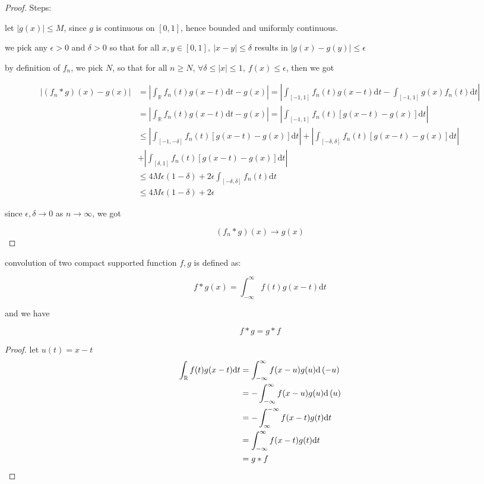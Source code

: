 \begin{proof}
    Steps:

    let $|g(x)| \le M$, since $g$ is continuous on $[0,1]$, hence bounded and uniformly continuous.

    we pick any $\epsilon > 0$ 
    and $\delta > 0$ so that 
    for all $x,y \in [0,1],\: |x-y| \le \delta $  results in $|g(x) -g(y)| \le \epsilon$

    by definition of $f_n$, we pick $N$, so that for all $n \ge N$, 
    $\forall  \delta \le |x| \le 1,\:  f(x) \le \epsilon$, 
    then we got

    \begin{align*}
        \left| (f_n \ast g)(x) - g(x) \right| &= \left| \int_{\mathbb{R}}f_n(t)g(x-t) \mathrm{d}t  - g(x)\right| = \left| \int_{[-1,1]}f_n(t)g(x-t) \mathrm{d}t  - \int_{[-1,1]}g(x) f_n(t) \mathrm{d}t \right| \\ 
        & = \left| \int_{\mathbb{R}}f_n(t)g(x-t) \mathrm{d}t  - g(x)\right| = \left| \int_{[-1,1]}f_n(t)\left[g(x-t) -g(x) \right]\mathrm{d}t   \right| \\
        & \le \left| \int_{[-1,-\delta]}f_n(t)\left[g(x-t) -g(x) \right]\mathrm{d}t   \right| + \left| \int_{[-\delta,\delta]}f_n(t)\left[g(x-t) -g(x) \right]\mathrm{d}t   \right| \\
        & + \left| \int_{[\delta,1]}f_n(t)\left[g(x-t) -g(x) \right]\mathrm{d}t   \right|\\
        & \le 4M\epsilon(1-\delta) + 2\epsilon \int_{[-\delta,\delta]}f_n(t)\mathrm{d}t    \\
        & \le 4M\epsilon(1-\delta) + 2\epsilon
    \end{align*}

    since $\epsilon, \delta \to 0$ as $n \to \infty$, we got

    \[
        (f_n \ast g)(x) \to g(x)
    \]


\end{proof}

\begin{thm}
    convolution of two compact supported function $f, g$ is defined as:

    \[
        f \ast g (x) = \int_{-\infty}^{\infty} f(t) g(x-t) \mathrm{d}t
    \]

    and we have

    \[
        f \ast g = g \ast f
    \]

\end{thm}

\begin{proof}
    let $u(t) = x-t$
   \begin{align*}
    \int_{\mathbb{R}} f(t) g(x-t) \mathrm{d}t &=\int_{-\infty}^{\infty}f(x-u)g(u) \mathrm{d} \left(- u \right) \\
    &= -\int_{-\infty}^{\infty}f(x-u)g(u) \mathrm{d} \left( u \right) \\
    &= -\int_{\infty}^{-\infty}f(x-t)g(t) \mathrm{d} t \\
    &= \int_{-\infty}^{\infty}f(x-t)g(t) \mathrm{d} t \\
    &= g \ast f
   \end{align*} 
\end{proof}

